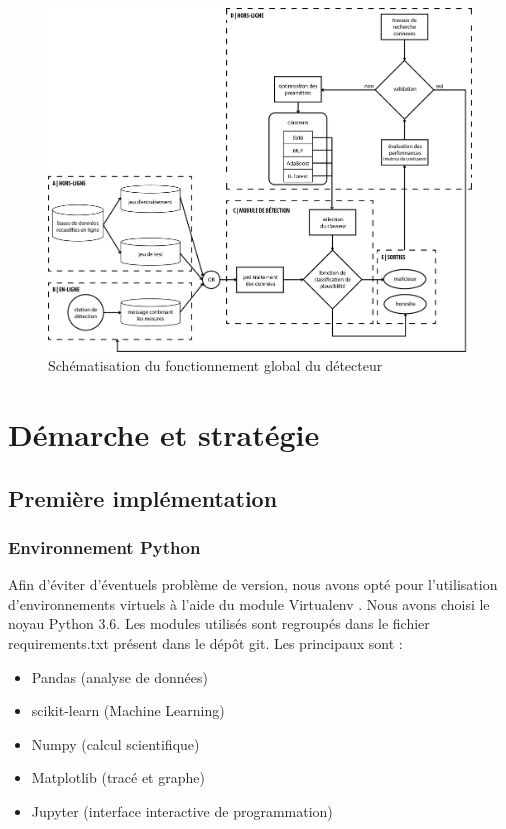 \documentclass[a4paper]{report}
\begin{document}
\begin{figure}
\centering
\includegraphics[width=\textwidth]{img/structure.png}
\caption{Schématisation du fonctionnement global du détecteur\label{fig:structure}}
\end{figure}

\chapter{Démarche et stratégie}

\section{Première implémentation}

\subsection{Environnement Python}

Afin d'éviter d'éventuels problème de version, nous avons opté pour l'utilisation d'environnements virtuels à l'aide du module Virtualenv \cite{venv}. Nous avons choisi le noyau Python 3.6. Les modules utilisés sont regroupés dans le fichier requirements.txt présent dans le dépôt git. Les principaux sont :
\begin{itemize}
\item Pandas (analyse de données) \cite{pandas}
\item scikit-learn (Machine Learning) \cite{sklearn}
\item Numpy (calcul scientifique) \cite{numpy}
\item Matplotlib (tracé et graphe) \cite{matplotlib}
\item Jupyter (interface interactive de programmation) \cite{jupyter}
\end{itemize}
\end{document}
